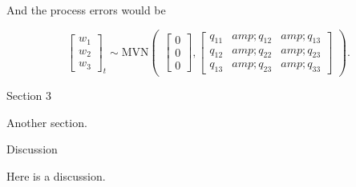 \documentclass[
  12pt,
]{book}
\begin{document}
And the process errors would be

{\[\begin{equation}
\begin{bmatrix}
    w_{1} \\
    w_{2} \\
    w_{3} \end{bmatrix}_t
\sim \text{MVN} \begin{pmatrix}
 \begin{bmatrix}
    0 \\
    0 \\
    0 \end{bmatrix},
 \begin{bmatrix}
    q_{11}&amp;q_{12}&amp;q_{13}\\
    q_{12}&amp;q_{22}&amp;q_{23}\\
    q_{13}&amp;q_{23}&amp;q_{33}\end{bmatrix}
\end{pmatrix}.
\label{eq:template2-pe}
\end{equation}\]}

\hypertarget{sec-uss-3}{}
Section 3

Another section.

\hypertarget{sec-uss-discussion}{}
Discussion

Here is a discussion.

  
\end{document}
